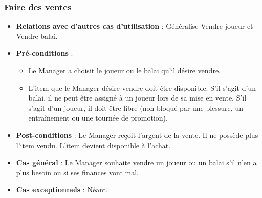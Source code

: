 \documentclass[a4paper,titlepage]{scrreprt}
\begin{document}
    \subsubsection{Faire des ventes}
      \begin{itemize}
        \item \textbf{Relations avec d'autres cas d'utilisation}  : Généralise Vendre joueur et Vendre balai.
        \item \textbf{Pré-conditions} :
        \begin{itemize}
            \item Le Manager a choisit le joueur ou le balai qu'il désire vendre.
            \item L'item que le Manager désire vendre doit être disponible. S'il s'agit d'un balai, il ne peut être assigné à un joueur lors de sa mise en vente. S'il s'agit d'un joueur, il doit être libre (non bloqué par une blessure, un entraînement ou une tournée de promotion).
        \end{itemize}    
        \item \textbf{Post-conditions} : Le Manager reçoit l’argent de la vente. Il ne possède plus l'item vendu. L'item devient disponible à l'achat.
        \item \textbf{Cas général} : Le Manager souhaite vendre un joueur ou un balai s’il n’en a plus besoin ou si ses finances vont mal. 
        \item \textbf{Cas exceptionnels} : Néant.
      \end{itemize}
\end{document}
